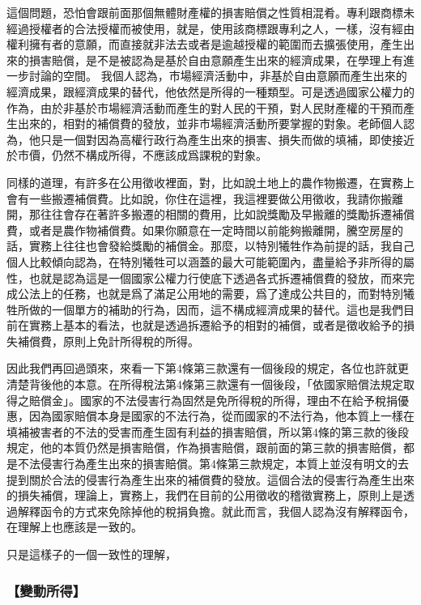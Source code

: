 \documentclass[oneside,sub3section]{ctexbook}
\begin{document}
這個問題，恐怕會跟前面那個無體財產權的損害賠償之性質相混肴。專利跟商標未經過授權者的合法授權而被使用，就是，使用該商標跟專利之人，一樣，沒有經由權利擁有者的意願，而直接就非法去或者是逾越授權的範圍而去擴張使用，產生出來的損害賠償，是不是被認為是基於自由意願產生出來的經濟成果，在學理上有進一步討論的空間。
我個人認為，市場經濟活動中，非基於自由意願而產生出來的經濟成果，跟經濟成果的替代，他依然是所得的一種類型。可是透過國家公權力的作為，由於非基於市場經濟活動而產生的對人民的干預，對人民財產權的干預而產生出來的，相對的補償費的發放，並非市場經濟活動所要掌握的對象。老師個人認為，他只是一個對因為高權行政行為產生出來的損害、損失而做的填補，即使接近於市價，仍然不構成所得，不應該成爲課稅的對象。

同樣的道理，有許多在公用徵收裡面，對，比如說土地上的農作物搬遷，在實務上會有一些搬遷補償費。比如說，你住在這裡，我這裡要做公用徵收，我請你搬離開，那往往會存在著許多搬遷的相關的費用，比如說獎勵及早搬離的獎勵拆遷補償費，或者是農作物補償費。如果你願意在一定時間以前能夠搬離開，騰空房屋的話，實務上往往也會發給獎勵的補償金。那麼，以特別犧牲作為前提的話，我自己個人比較傾向認為，在特別犧牲可以涵蓋的最大可能範圍內，盡量給予非所得的屬性，也就是認為這是一個國家公權力行使底下透過各式拆遷補償費的發放，而來完成公法上的任務，也就是爲了滿足公用地的需要，爲了達成公共目的，而對特別犧牲所做的一個單方的補助的行為，因而，這不構成經濟成果的替代。這也是我們目前在實務上基本的看法，也就是透過拆遷給予的相對的補償，或者是徵收給予的損失補償費，原則上免計所得稅的所得。

因此我們再回過頭來，來看一下第4條第三款還有一個後段的規定，各位也許就更清楚背後他的本意。在所得稅法第4條第三款還有一個後段，「依國家賠償法規定取得之賠償金」。國家的不法侵害行為固然是免所得稅的所得，理由不在給予稅捐優惠，因為國家賠償本身是國家的不法行為，從而國家的不法行為，他本質上一樣在填補被害者的不法的受害而產生固有利益的損害賠償，所以第4條的第三款的後段規定，他的本質仍然是損害賠償，作為損害賠償，跟前面的第三款的損害賠償，都是不法侵害行為產生出來的損害賠償。第4條第三款規定，本質上並沒有明文的去提到關於合法的侵害行為產生出來的補償費的發放。這個合法的侵害行為產生出來的損失補償，理論上，實務上，我們在目前的公用徵收的稽徵實務上，原則上是透過解釋函令的方式來免除掉他的稅捐負擔。就此而言，我個人認為沒有解釋函令，在理解上也應該是一致的。

只是這樣子的一個一致性的理解，

\hypertarget{ux8b8aux52d5ux6240ux5f97}{%
\subsubsection{【變動所得】}\label{ux8b8aux52d5ux6240ux5f97}}
\end{document}

